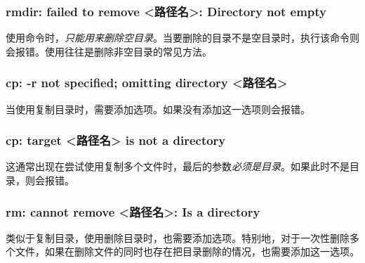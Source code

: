 \subsubsection{rmdir: failed to remove <路径名>: Directory not empty}

使用命令时，\emph{只能用来删除空目录}。当要删除的目录不是空目录时，执行该命令则会报错。使用往往是删除非空目录的常见方法。

\subsubsection{cp: -r not specified; omitting directory <路径名>}

当使用复制目录时，需要添加选项。如果没有添加这一选项则会报错。

\subsubsection{cp: target <路径名> is not a directory}

这通常出现在尝试使用复制多个文件时，最后的参数\emph{必须是目录}。如果此时不是目录，则会报错。

\subsubsection{rm: cannot remove <路径名>: Is a directory}

类似于复制目录，使用删除目录时，也需要添加选项。特别地，对于一次性删除多个文件，如果在删除文件的同时也存在把目录删除的情况，也需要添加这一选项。



